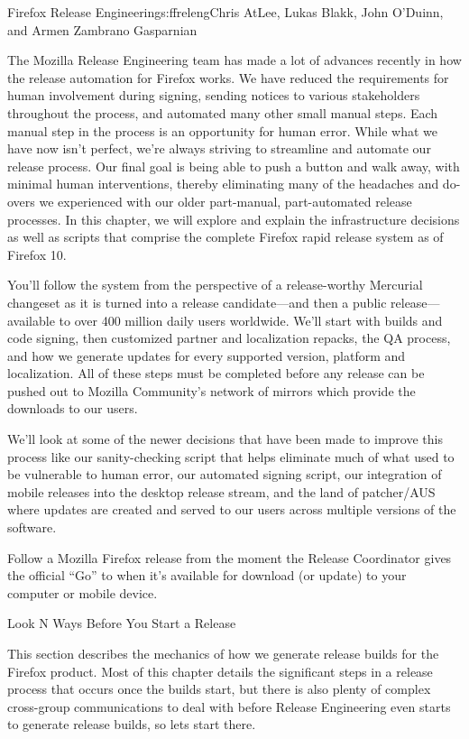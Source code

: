 \begin{aosachapter}{Firefox Release Engineering}{s:ffreleng}{Chris AtLee, Lukas Blakk, John O'Duinn, and Armen Zambrano Gasparnian}

The Mozilla Release Engineering team has made a lot of advances
recently in how the release automation for Firefox works. We have
reduced the requirements for human involvement during signing, sending
notices to various stakeholders throughout the process, and automated
many other small manual steps. Each manual step in the process is an
opportunity for human error. While what we have now isn't perfect,
we're always striving to streamline and automate our release
process. Our final goal is being able to push a button and walk away,
with minimal human interventions, thereby eliminating many of the
headaches and do-overs we experienced with our older part-manual,
part-automated release processes. In this chapter, we will explore and
explain the infrastructure decisions as well as scripts that comprise
the complete Firefox rapid release system as of Firefox 10.

You'll follow the system from the perspective of a release-worthy
Mercurial changeset as it is turned into a release candidate---and
then a public release---available to over 400 million daily users
worldwide.  We'll start with builds and code signing, then customized
partner and localization repacks, the QA process, and how we generate
updates for every supported version, platform and localization. All of
these steps must be completed before any release can be pushed out to
Mozilla Community's network of mirrors which provide the downloads to
our users.

We'll look at some of the newer decisions that have been made to
improve this process like our sanity-checking script that helps
eliminate much of what used to be vulnerable to human error, our
automated signing script, our integration of mobile releases into the
desktop release stream, and the land of patcher/AUS where updates are
created and served to our users across multiple versions of the
software.

Follow a Mozilla Firefox release from the moment the Release
Coordinator gives the official ``Go'' to when it's available for
download (or update) to your computer or mobile device.

\begin{aosasect1}{Look N Ways Before You Start a Release}

This section describes the mechanics of how we generate release builds
for the Firefox product. Most of this chapter details the significant
steps in a release process that occurs once the builds start, but
there is also plenty of complex cross-group communications to deal
with before Release Engineering even starts to generate release
builds, so lets start there.


\end{aosasect1}
\end{aosachapter}
